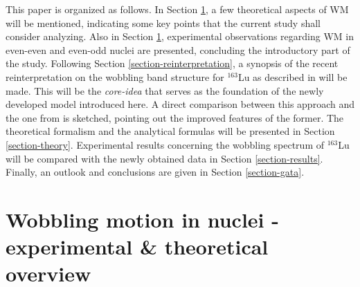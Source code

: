 \documentclass[11pt]{article}
\begin{document}
This paper is organized as follows. In Section \ref{section2-wm}, a few theoretical aspects of WM will be mentioned, indicating some key points that the current study shall consider analyzing. Also in Section \ref{section2-wm}, experimental observations regarding WM in even-even and even-odd nuclei are presented, concluding the introductory part of the study. Following Section \ref{section-reinterpretation}, a synopsis of the recent reinterpretation on the wobbling band structure for $^{163}$Lu as described in \cite{raduta2020towards} will be made. This will be the \emph{core-idea} that serves as the foundation of the newly developed model introduced here. A direct comparison between this approach and the one from \cite{raduta2020towards} is sketched, pointing out the improved features of the former. The theoretical formalism and the analytical formulas will be presented in Section \ref{section-theory}. Experimental results concerning the wobbling spectrum of $^{163}$Lu will be compared with the newly obtained data in Section \ref{section-results}. Finally, an outlook and conclusions are given in Section \ref{section-gata}.


\section{Wobbling motion in nuclei - experimental \& theoretical overview}
\label{section2-wm}
\end{document}
